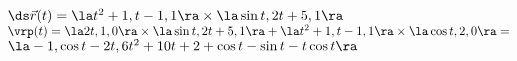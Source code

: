 {$\ds \vec r(t) = \la t^2+1, t-1,1\ra\times \la \sin t, 2t+5,1\ra$
}
{
$\vrp(t) = \la 2t,1,0\ra \times \la \sin t,2t+5,1\ra + \la t^2+1,t-1,1\ra\times\la \cos t, 2,0\ra =$\\
$\la -1, \cos t - 2t, 6t^2+10t+2+\cos t - \sin t - t\cos t \ra$
}

